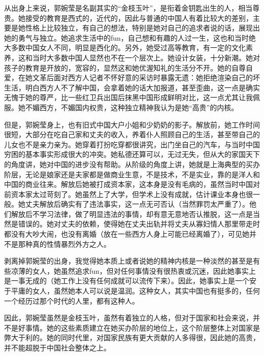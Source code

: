 从出身上来说，郭婉莹是名副其实的“金枝玉叶”，是衔着金钥匙出生的人，相当尊贵。她接受的教育是西式的，近代的，因此与普通的中国人有着比较大的差别，主要是她性格上比较独立，有自己的想法，特别是她对自己的追求者说的话，展现出她的勇气与独立。她追求生活中的fun，自己想和有趣的人过一生，这也和当时绝大多数中国女人不同，明显是西化的。另外，她受过高等教育，有一定的文化素养，这和当时大多数中国人显然也不在一个层次上。她设计女装，十分新潮。她对孩子的教育是开放的，宽容的，显然这和她优渥知礼的生活分不开。她的自尊自爱，在她文革后面对西方人记者不怀好意的采访时暴露无遗：她拒绝渲染自己的坏生活，明白西方人不了解中国，会拿着她的话大加报道，甚至歪曲，这一点是确实无愧于她的尊严，比一些红卫兵出国后抹黑中国形成鲜明对比，这一点尤其让我佩服。她不媚西方，不媚国内权贵，这种独立精神我认为是她“高贵”的内核。

但是，郭婉莹身上，也有旧式中国大户小姐和少奶奶的影子。解放前，她工作时间很短，大部分在吃自己家和丈夫的收入，养着仆人照顾自己的生活，甚至带自己的儿女也不是亲力亲为。她穿着打扮吃穿都很讲究，出门坐自己的汽车，与当时中国穷困的基本事实形成很大的冲突。她私德还算可以，无过无失，但从大的家国天下的角度讲，她对中国的进步没有帮助。从阶级的角度上讲，她就是上海典型的买办阶层，无论是娘家还是夫家都是做商业生意，不是技术，不是实业，靠的是洋人和中国的商业往来。解放后她被打成资本家，这本身是没有毛病的，虽然当时中国对前资本家太过苛刻了。她虽然上了大学，但学术上没有成就，估计课业本身也很一般。她丈夫解放后确实有了违法事实，这一点无可否认（当然罪罚太严重了）。他们解放后不学习法律，做了明显违法的事情，却有意无意地否认推脱，这一点是当然是错误的。她对丈夫的依赖，使得她在丈夫出轨并将丈夫从寡妇情人那里带走时都没有大吵大闹，也没有离婚（放在一些西方人身上可能已经离婚了），可见她并不是那种真的性情暴烈外方之人。

剥离掉郭婉莹的出身，我觉得她本质上或者说她的精神内核是一种淡然的甚至是有些凉薄的女人，她虽然追求fun，但对任何事情没有很热衷或沉迷，因此她事实上是一事无成的（她工作上没有任何成就可以流传下来）。因此，她事实上是一个安于平庸的女人，虽然她本人可以说是温润。这种女人，其实中国也有挺多的，任何一个经历过那个时代的人里，都有这种人。

因此，郭婉莹虽然是金枝玉叶，虽然有着独立的人格，但对于国家和社会来说，并不是好事情。她的这些素质建立在她买办阶层的地位上，这个阶层整体上对国家是弊大于利的。她的同时代里，对国家民族有更大贡献的人多得很，因此她的高贵，并不能超脱于中国社会整体之上。

